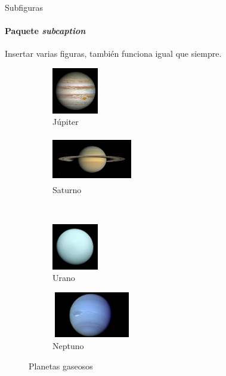 \documentclass{beamer}
\begin{document}
    \begin{frame}[fragile]{Subfiguras}
        \framesubtitle{Paquete \emph{subcaption}}
        Insertar varias figuras, también funciona igual que siempre.
        \begin{figure}
            \centering
            \begin{subfigure}[b]{0.4\textwidth}
                \centering
                \includegraphics[width=2cm, height=2cm]{jupiter.jpg}
                \caption{Júpiter}
                \label{fig:jupiter}
            \end{subfigure}
            \hspace{1cm}
            \begin{subfigure}[b]{0.4\textwidth}
                \centering
                \includegraphics[width=3.5cm, height=2cm]{saturno.jpg}
                \caption{Saturno}
                \label{fig:saturno}
            \end{subfigure}\\
            \begin{subfigure}[b]{0.4\textwidth}
                \centering
                \includegraphics[width=2cm, height=2cm]{urano.jpg}
                \caption{Urano}
                \label{fig:urano}
            \end{subfigure}
            \hspace{1cm}
            \begin{subfigure}[b]{0.4\textwidth}
                \centering
                \includegraphics[width=3.5cm, height=2cm]{neptuno.jpg}
                \caption{Neptuno}
                \label{fig:neptuno}
            \end{subfigure}
            \caption{Planetas gaseosos}
            \label{fig:planetas}
        \end{figure}
    \end{frame}
\end{document}
